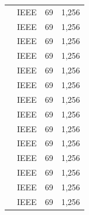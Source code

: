 \documentclass[preprint,12pt,authoryear]{elsarticle}
\begin{document}
\begin{longtable}{p{6.5cm}p{3.5cm}p{0.3cm}p{0.5cm}}
            \citet{DUNDAR2011}            & IEEE                    & 69  & 1,256\\
            \citet{DUNDAR2011}            & IEEE                    & 69  & 1,256\\
            \citet{DUNDAR2011}            & IEEE                    & 69  & 1,256\\
            \citet{DUNDAR2011}            & IEEE                    & 69  & 1,256\\
            \citet{DUNDAR2011}            & IEEE                    & 69  & 1,256\\
            \citet{DUNDAR2011}            & IEEE                    & 69  & 1,256\\
            \citet{DUNDAR2011}            & IEEE                    & 69  & 1,256\\
            \citet{DUNDAR2011}            & IEEE                    & 69  & 1,256\\
            \citet{DUNDAR2011}            & IEEE                    & 69  & 1,256\\
            \citet{DUNDAR2011}            & IEEE                    & 69  & 1,256\\
            \citet{DUNDAR2011}            & IEEE                    & 69  & 1,256\\
            \citet{DUNDAR2011}            & IEEE                    & 69  & 1,256\\
            \citet{DUNDAR2011}            & IEEE                    & 69  & 1,256\\
            \citet{DUNDAR2011}            & IEEE                    & 69  & 1,256
\end{longtable}
\end{document}
